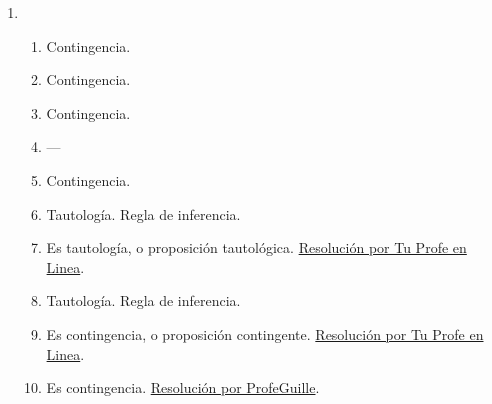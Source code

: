 \documentclass[a4paper]{article}
\newcommand{\exercise}{\item}
\begin{document}
\begin{enumerate}
\begin{enumerate} [label=(\alph*)]
		\item Una opción es utilizar tres corrientes: baja, uno mediana y uno alta. La dificultad a partir de allí es armar maquinas físicas que logren representar las compuertas lógicas a partir de dichos voltajes. Análogamente cualquier cosa que represente una corriente (como agua o dominós) podría ser empleada. 
		\item La dificultad principal para representar los estados lógicos es pasar de procesos físicos analógicos, con posibilidad de tener infinitos valores, a valores digitales con dos estados bien definidos. 
		\item El álgebra de Boole es un sistema matemático para representar variables lógicas. Para constituir el sistema se definen operaciones complemento, suma, producto, etc), valores que pueden tomar las variables (0,1) y otras notaciones y reglas que permiten modelar circuitos lógicos.
		\item Negación $\neg p$ se escribe $\bar{p}$, conjunción $p\land q$ es producto $p.q$ y disyunción $p \lor q$ es suma $p+q$. Estas operaciones se definen para ser utilizadas con los valores $0$ y $1$ a partir de reglas internas, por ejemplo los casos que definen a la siyunción son $0+0=0$, $1+0=1$, $0+1=1$, $1+1=1$, que son análogos a la tabla de verdad.
		\item A la DNF se le suele llamar \textit{suma de productos} y a la CNF \textit{producto de sumas}.
\item ---\item ---\item ---\end{enumerate}\exercise\begin{enumerate} [label=(\alph*)]		\item Contingencia.
		\item Contingencia.
		\item Contingencia.
\item ---		\item Contingencia.
		\item Tautología. Regla de inferencia.
		\item Es tautología, o proposición tautológica. \href{https://youtu.be/NZSuHeymu4M?t=382}{Resolución por Tu Profe en Linea}.
		\item Tautología. Regla de inferencia.
		\item Es contingencia, o proposición contingente. \href{https://youtu.be/NZSuHeymu4M?t=829}{Resolución por Tu Profe en Linea}.
		\item Es contingencia. \href{https://youtu.be/n_t1f0xa3D0?t=40}{Resolución por ProfeGuille}.

\end{enumerate}
\end{enumerate}
\end{document}
